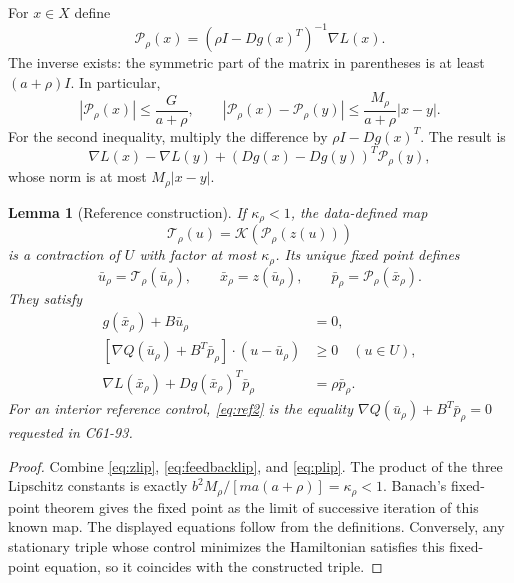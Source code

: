 \documentclass[11pt,a4paper]{article}
\newtheorem{lemma}[theorem]{Lemma}
\begin{document}
For $x\in X$ define
\begin{equation}\label{eq:stationaryp}
 \mathcal P_\rho(x)=(\rho I-Dg(x)^T)^{-1}\nabla L(x).
\end{equation}
The inverse exists: the symmetric part of the matrix in parentheses is
at least $(a+\rho)I$. In particular,
\begin{equation}\label{eq:plip}
 |\mathcal P_\rho(x)|\leq\frac G{a+\rho},\qquad
 |\mathcal P_\rho(x)-\mathcal P_\rho(y)|
       \leq\frac{M_\rho}{a+\rho}|x-y|.
\end{equation}
For the second inequality, multiply the difference by
$\rho I-Dg(x)^T$. The result is
\[
 \nabla L(x)-\nabla L(y)
       +(Dg(x)-Dg(y))^T\mathcal P_\rho(y),
\]
whose norm is at most $M_\rho|x-y|$.

\begin{lemma}[Reference construction]\label{lem:reference}
If $\kappa_\rho<1$, the data-defined map
\begin{equation}\label{eq:contraction}
 \mathcal T_\rho(u)=\mathcal K(\mathcal P_\rho(z(u)))
\end{equation}
is a contraction of $U$ with factor at most $\kappa_\rho$.
Its unique fixed point defines
\[
 \bar u_\rho=\mathcal T_\rho(\bar u_\rho),\qquad
 \bar x_\rho=z(\bar u_\rho),\qquad
 \bar p_\rho=\mathcal P_\rho(\bar x_\rho).
\]
They satisfy
\begin{align}
 g(\bar x_\rho)+B\bar u_\rho&=0,\label{eq:ref1}\\
 [\nabla Q(\bar u_\rho)+B^T\bar p_\rho]
                 \cdot(u-\bar u_\rho)&\geq0\quad(u\in U),\label{eq:ref2}\\
 \nabla L(\bar x_\rho)+Dg(\bar x_\rho)^T\bar p_\rho
                 &=\rho\bar p_\rho.\label{eq:ref3}
\end{align}
For an interior reference control, \eqref{eq:ref2} is the equality
$\nabla Q(\bar u_\rho)+B^T\bar p_\rho=0$ requested in C61-93.
\end{lemma}
\begin{proof}
Combine \eqref{eq:zlip}, \eqref{eq:feedbacklip}, and \eqref{eq:plip}.
The product of the three Lipschitz constants is exactly
$b^2M_\rho/[ma(a+\rho)]=\kappa_\rho<1$.
Banach's fixed-point theorem gives the fixed point as the limit of
successive iteration of this known map. The displayed equations follow
from the definitions. Conversely, any stationary triple whose control
minimizes the Hamiltonian satisfies this fixed-point equation, so it
coincides with the constructed triple.
\end{proof}
\end{document}
